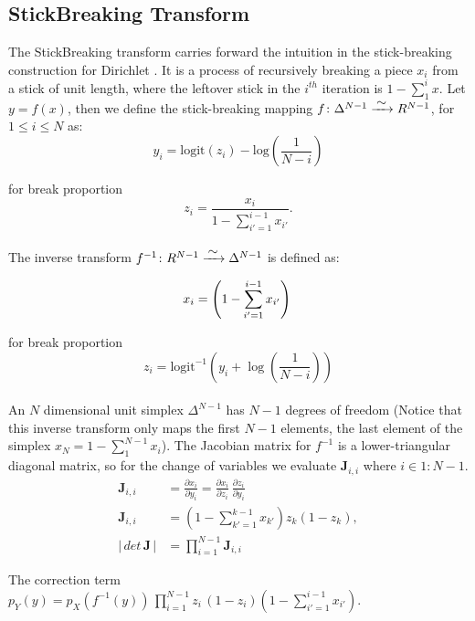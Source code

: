 \documentclass[11pt]{article}
\newcommand{\abs}[1]{\left| #1 \right|}
\begin{document}
\subsection{StickBreaking Transform}

The StickBreaking transform carries forward the intuition in the stick-breaking construction for Dirichlet \cite{sethuraman1994constructive}. It is a process of recursively breaking a piece $x_i$ from a stick of unit length, where the leftover stick in the $i^{th}$ iteration is $ 1 - \sum_{1}^{i}x$. Let $y = f(x)$, then we define the stick-breaking mapping $ f \colon \Delta^{N-1} \xrightarrow{\makebox[0.4cm]{$\sim$}}  R^{N-1}$, for $1 \leq i \leq N$ as:	
\[
y_i
= \mathrm{logit}(z_i) - \mbox{log}\left(\frac{1}{N-i}
   \right) 
   \]
  
for break proportion 
\[ 
 z_i = \frac{x_i}{1 - \sum_{i' = 1}^{i-1} x_{i'}}.
\]\\

The inverse transform $ f^{-1} \colon R^{N-1} \xrightarrow{\makebox[0.4cm]{$\sim$}}  \Delta^{N-1}$ is defined as:

\[
x_i = \left( 1 - \sum_{i'=1}^{i-1} x_{i'} \right)\\
\]

for break proportion \[z_i = \mathrm{logit}^{-1} \left( y_i  + \log \left( \frac{1}{N - i}
                                            \right)\right)
                                            \]\\
                                            
                                            
An $N$ dimensional unit simplex $\Delta^{N-1}$ has $N-1$ degrees of freedom (Notice that this inverse transform only maps the first $N-1$ elements, the last element of the simplex $x_{N} = 1 - \sum_1^{N-1}{x_i}$). The Jacobian matrix for $f^{-1}$ is a lower-triangular diagonal matrix, so for the change of variables we evaluate $\mathbf{J}_{i, i}$ where $i \in 1:N-1$.
\begin{align*}
\mathbf{J}_{i, i} &= \frac{\partial x_i}{\partial y_i}
=
\frac{\partial x_i}{\partial z_i} \,
\frac{\partial z_i}{\partial y_i}\\
\mathbf{J}_{i, i} &= \left(
  1 - \sum_{k' = 1}^{k-1} x_{k'}
   \right) z_k (1 - z_k),\\
   \abs{\, det \, \textbf{J} \,} &= \prod_{i=1}^{N-1} \textbf{J}_{i,i}
\end{align*}

The correction term $p_Y(y) = p_X(f^{-1}(y))\,
\prod_{i=1}^{N-1}z_i\,(1 - z_i)\left(1 - \sum_{i'=1}^{i-1} x_{i'}\right).$
\end{document}
